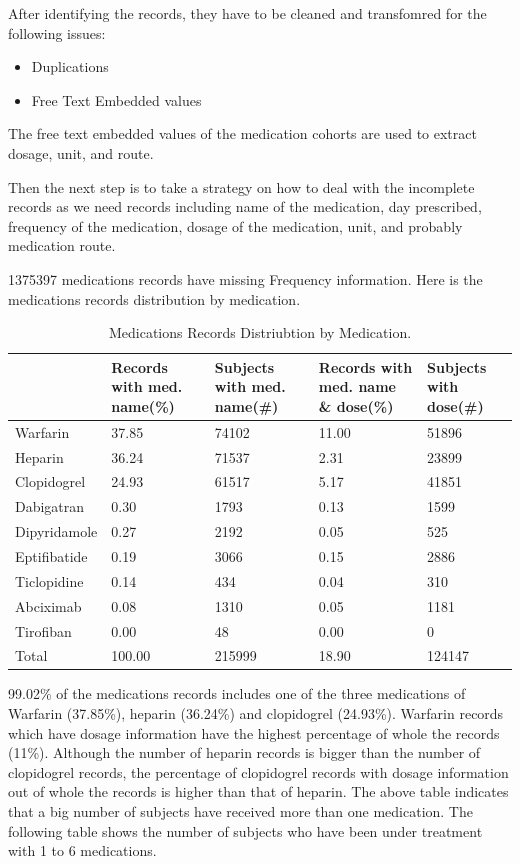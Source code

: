 \documentclass{article}
\begin{document}
After identifying the records, they have to be cleaned and transfomred for the following issues:
\begin{itemize}
  \item Duplications
  \item Free Text Embedded values
\end{itemize}

The free text embedded values of the medication cohorts are used to extract dosage, unit, and route.

Then the next step is to take a strategy on how to deal with the incomplete records as we need records including name of the medication, day prescribed, frequency of the medication, dosage of the medication, unit, and probably medication route.

1375397 medications records have missing Frequency information. 
Here is the medications records distribution by medication.


\begin{table}[ht]
\centering
\begin{tabular}{lp{2cm}p{2cm}p{2cm}p{2cm}}
  \hline
 & Records with med. name(\%) & Subjects with med. name(\#) & Records with med. name \& dose(\%) & Subjects with dose(\#) \\ 
  \hline
Warfarin & 37.85 & 74102 & 11.00 & 51896 \\ 
  Heparin & 36.24 & 71537 & 2.31 & 23899 \\ 
  Clopidogrel & 24.93 & 61517 & 5.17 & 41851 \\ 
  Dabigatran & 0.30 & 1793 & 0.13 & 1599 \\ 
  Dipyridamole & 0.27 & 2192 & 0.05 & 525 \\ 
  Eptifibatide & 0.19 & 3066 & 0.15 & 2886 \\ 
  Ticlopidine & 0.14 & 434 & 0.04 & 310 \\ 
  Abciximab & 0.08 & 1310 & 0.05 & 1181 \\ 
  Tirofiban & 0.00 & 48 & 0.00 & 0 \\ 
   \hline
Total & 100.00 & 215999 & 18.90 & 124147 \\ 
   \hline
\end{tabular}
\caption{Medications Records Distriubtion by Medication.} 
\label{Table:1}
\end{table}


99.02\% of the medications records includes one of the three medications of Warfarin (37.85\%), heparin (36.24\%) and clopidogrel (24.93\%). Warfarin records which have dosage information have the highest percentage of whole the records (11\%). Although the number of heparin records is bigger than the number of clopidogrel records, the percentage of clopidogrel records with dosage information out of whole the records is higher than that of heparin.
The above table indicates that a big number of subjects have received more than one medication. The following table shows the number of subjects who have been under treatment with 1 to 6 medications.
\end{document}
